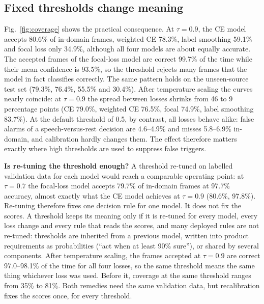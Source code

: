 \documentclass[conference]{IEEEtran}
\begin{document}
\subsection{Fixed thresholds change meaning}
Fig.~\ref{fig:coverage} shows the practical consequence. At $\tau=0.9$, the CE model accepts 80.6\% of in-domain frames, weighted CE 78.3\%, label smoothing 59.1\% and focal loss only 34.9\%, although all four models are about equally accurate. The accepted frames of the focal-loss model are correct 99.7\% of the time while their mean confidence is 93.5\%, so the threshold rejects many frames that the model in fact classifies correctly. The same pattern holds on the unseen-source test set (79.3\%, 76.4\%, 55.5\% and 30.4\%). After temperature scaling the curves nearly coincide: at $\tau=0.9$ the spread between losses shrinks from 46 to 9 percentage points (CE 79.0\%, weighted CE 76.5\%, focal 74.9\%, label smoothing 83.7\%). At the default threshold of 0.5, by contrast, all losses behave alike: false alarms of a speech-versus-rest decision are 4.6--4.9\% and misses 5.8--6.9\% in-domain, and calibration hardly changes them. The effect therefore matters exactly where high thresholds are used to suppress false triggers.

\textbf{Is re-tuning the threshold enough?} A threshold re-tuned on labelled validation data for each model would reach a comparable operating point: at $\tau=0.7$ the focal-loss model accepts 79.7\% of in-domain frames at 97.7\% accuracy, almost exactly what the CE model achieves at $\tau=0.9$ (80.6\%, 97.8\%). Re-tuning therefore fixes one decision rule for one model. It does not fix the scores. A threshold keeps its meaning only if it is re-tuned for every model, every loss change and every rule that reads the scores, and many deployed rules are not re-tuned: thresholds are inherited from a previous model, written into product requirements as probabilities (``act when at least 90\% sure''), or shared by several components. After temperature scaling, the frames accepted at $\tau=0.9$ are correct 97.0--98.1\% of the time for all four losses, so the same threshold means the same thing whichever loss was used. Before it, coverage at the same threshold ranges from 35\% to 81\%. Both remedies need the same validation data, but recalibration fixes the scores once, for every threshold.
\end{document}
